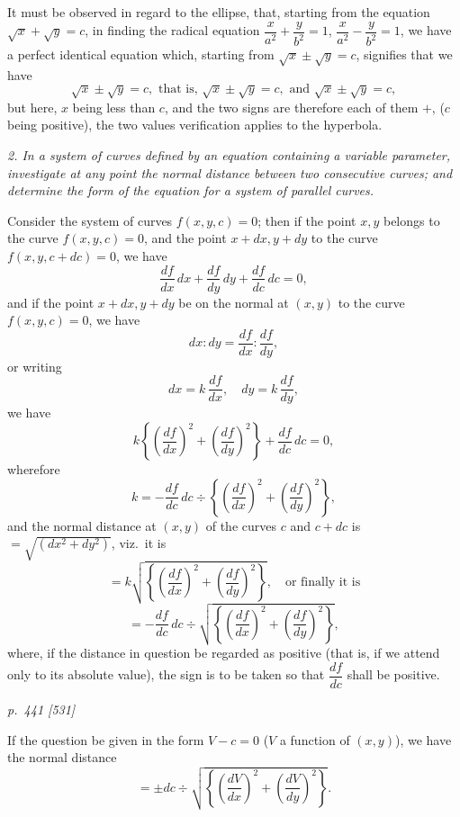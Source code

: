 \documentclass[11pt,a4paper]{book}
\begin{document}
It must be observed in regard to the ellipse, that, starting from the equation
$\sqrt{x} + \sqrt{y} = c$, in finding the radical equation $\dfrac{x}{a^2} + \dfrac{y}{b^2} = 1$, $\dfrac{x}{a^2} - \dfrac{y}{b^2} = 1$, we have a perfect
identical equation which, starting from $\sqrt{x} \pm \sqrt{y} = c$, signifies that we have
\[
\sqrt{x} \pm \sqrt{y} = c, \text{ that is, } \sqrt{x} \pm \sqrt{y} = c, \text{ and } \sqrt{x} \pm \sqrt{y} = c,
\]
but here, $x$ being less than $c$, and the two signs are therefore each of them $+$, ($c$ being positive), the two values verification applies to the hyperbola.

\textit{2. In a system of curves defined by an equation containing a variable parameter, investigate at any point the normal distance between two consecutive curves; and determine the form of the equation for a system of parallel curves.}

Consider the system of curves $f(x, y, c) = 0$; then if the point $x, y$ belongs to the curve $f(x, y, c) = 0$, and the point $x + dx, y + dy$ to the curve $f(x, y, c + dc) = 0$, we have
\[
\frac{df}{dx}\,dx + \frac{df}{dy}\,dy + \frac{df}{dc}\,dc = 0,
\]
and if the point $x + dx, y + dy$ be on the normal at $(x, y)$ to the curve $f(x, y, c) = 0$, we have
\[
dx : dy = \frac{df}{dx} : \frac{df}{dy},
\]
or writing
\[
dx = k\,\frac{df}{dx},\quad dy = k\,\frac{df}{dy},
\]
we have
\[
k\left\{\left(\frac{df}{dx}\right)^2 + \left(\frac{df}{dy}\right)^2\right\} + \frac{df}{dc}\,dc = 0,
\]
wherefore
\[
k = -\frac{df}{dc}\,dc\div \left\{\left(\frac{df}{dx}\right)^2 + \left(\frac{df}{dy}\right)^2\right\},
\]
and the normal distance at $(x, y)$ of the curves $c$ and $c + dc$ is $= \sqrt{(dx^2 + dy^2)}$, viz.\ it is
\[
= k\sqrt{\left\{\left(\frac{df}{dx}\right)^2 + \left(\frac{df}{dy}\right)^2\right\}},\quad \text{or finally it is}
\]
\[
= -\frac{df}{dc}\,dc\div \sqrt{\left\{\left(\frac{df}{dx}\right)^2 + \left(\frac{df}{dy}\right)^2\right\}},
\]
where, if the distance in question be regarded as positive (that is, if we attend only
to its absolute value), the sign is to be taken so that $\dfrac{df}{dc}$ shall be positive.

\clearpage

\bigskip
\textit{p.~441 [531]}
\smallskip

If the question be given in the form $V - c = 0$ ($V$ a function of $(x, y)$), we have the
normal distance
\[
= \pm dc \div \sqrt{\left\{\left(\frac{dV}{dx}\right)^2 + \left(\frac{dV}{dy}\right)^2\right\}}.
\]
\end{document}
